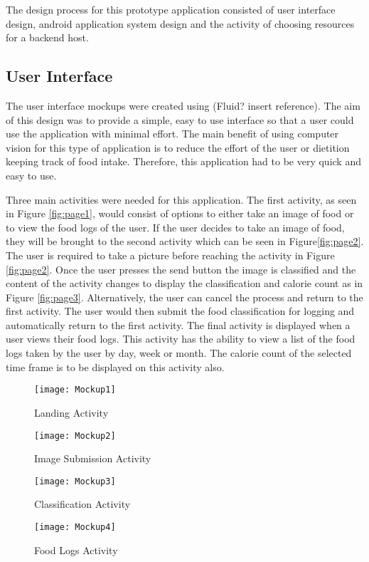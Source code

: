 The design process for this prototype application consisted of user interface design, android application system design and the activity of choosing resources for a backend host.

\subsection*{User Interface}
The user interface mockups were created using (Fluid? insert reference).
The aim of this design was to provide a simple, easy to use interface so that a user could use the application with minimal effort.
The main benefit of using computer vision for this type of application is to reduce the effort of the user or dietition keeping track of food intake.
Therefore, this application had to be very quick and easy to use.

Three main activities were needed for this application.
The first activity, as seen in Figure \ref{fig:page1}, would consist of options to either take an image of food or to view the food logs of the user.
If the user decides to take an image of food, they will be brought to the second activity which can be seen in Figure\ref{fig:page2}.
The user is required to take a picture before reaching the activity in Figure \ref{fig:page2}.
Once the user presses the send button the image is classified and the content of the activity changes to display the classification and calorie count as in Figure \ref{fig:page3}.
Alternatively, the user can cancel the process and return to the first activity.
The user would then submit the food classification for logging and automatically return to the first activity.
The final activity is displayed when a user views their food logs.
This activity has the ability to view a list of the food logs taken by the user by day, week or month.
The calorie count of the selected time frame is to be displayed on this activity also.

\begin{figure}[h] 
  \label{ fig7} 
  \begin{minipage}[b]{0.5\linewidth}
    \centering
    \texttt{[image: Mockup1]} 
    \caption{Landing Activity} 
  \label{fig:page1}
    \vspace{4ex}
  \end{minipage}%
  \begin{minipage}[b]{0.5\linewidth}
    \centering
    \texttt{[image: Mockup2]} 
    \caption{Image Submission Activity} 
  \label{fig:page2}
    \vspace{4ex}
  \end{minipage} 
  \begin{minipage}[b]{0.5\linewidth}
    \centering
    \texttt{[image: Mockup3]} 
    \caption{Classification Activity} 
    \label{fig:page3}
    \vspace{4ex}
  \end{minipage}%
  \begin{minipage}[b]{0.5\linewidth}
    \centering
    \texttt{[image: Mockup4]} 
    \caption{Food Logs Activity} 
    \label{fig:page4}
    \vspace{4ex}
  \end{minipage} 
\end{figure}
\afterpage{\clearpage}
